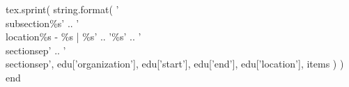 \documentclass[]{plushcv}
\begin{document}
\begin{minipage}[t]{0.25\textwidth}
\begin{luacode}
    tex.sprint(
      string.format(
	'\\subsection{\%s}' ..
	'\\location{\%s - \%s | \%s}' ..
	'\%s' ..
	'\\sectionsep' ..
	'\\sectionsep',
	edu['organization'],
	edu['start'],
	edu['end'],
	edu['location'],
	items
      )
    )
  end
\end{luacode}






\end{minipage}
\end{document}
